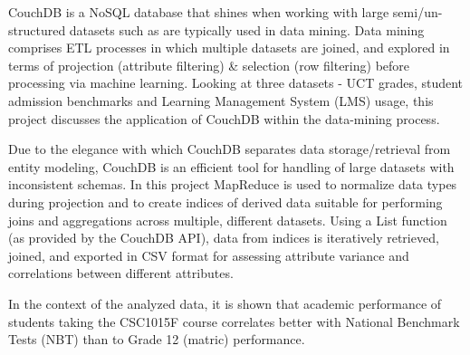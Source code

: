 CouchDB is a NoSQL database that shines when working with large semi/un-structured datasets such as are typically used in data mining. Data mining comprises ETL processes in which multiple datasets are joined, and explored in terms of projection (attribute filtering) \& selection (row filtering) before processing via machine learning. Looking at three datasets - UCT grades, student admission benchmarks and Learning Management System (LMS) usage, this project discusses the application of CouchDB within the data-mining process.

Due to the elegance with which CouchDB separates data storage/retrieval from entity modeling, CouchDB is an efficient tool for handling of large datasets with inconsistent schemas. In this project MapReduce is used to normalize data types during projection and to create indices of derived data suitable for performing joins and aggregations across multiple, different datasets. Using a List function (as provided by the CouchDB API), data from indices is iteratively retrieved, joined, and exported in CSV format for assessing attribute variance and correlations between different attributes.

In the context of the analyzed data, it is shown that academic performance of students taking the CSC1015F course correlates better with National Benchmark Tests (NBT) than to Grade 12 (matric) performance.